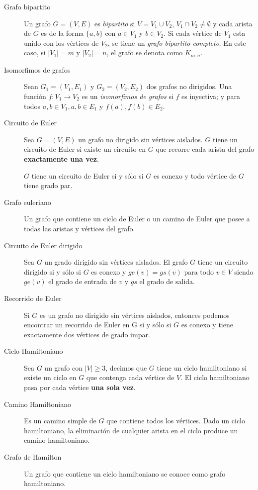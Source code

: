 \begin{description}
	\item[Grafo bipartito] Un grafo $G = (V,E)$ es \emph{bipartito} si $V = V_1 \cup V_2$, $V_1 \cap V_2 \neq \emptyset$ y cada arista de $G$ es de la forma $\{ a, b \}$ con $a \in V_1$ y $b \in V_2$. Si cada vértice de $V_1$ esta unido con los vértices de $V_2$, se tiene un \emph{grafo bipartito completo}.
	En este caso, si $|V_1| = m$ y $|V_2| = n$, el grafo se denota como $K_{m,n}$.
	
	\item[Isomorfimos de grafos] Sean $G_1 = (V_1, E_1)$ y $G_2 = (V_2, E_2)$ dos grafos no dirigidos.
	Una función $f:V_1 \rightarrow V_2$ es un \emph{isomorfimos de grafos} si $f$ es inyectiva; y para todos $a,b \in V_1, {a,b} \in E_1$ y ${f(a),f(b)} \in E_2$.
	
	\item[Circuito de Euler] Sea $G = (V,E)$ un grafo no dirigido sin vértices aislados.
	$G$ tiene un circuito de Euler si existe un circuito en $G$ que recorre cada arista del grafo \textbf{exactamente una vez}.
	
	$G$ tiene un circuito de Euler si y sólo si $G$ es conexo y todo vértice de $G$ tiene grado par.
	
	\item[Grafo euleriano] Un grafo que contiene un ciclo de Euler o un camino de Euler que posee a todas las aristas y vértices del grafo.
	
	\item[Circuito de Euler dirigido] Sea $G$ un grado dirigido sin vértices aislados.
	El grafo $G$ tiene un circuito dirigido si y sólo si $G$ es conexo y $ge(v) = gs(v)$ para todo $v \in V$ siendo $ge(v)$ el grado de entrada de $v$ y $gs$ el grado de salida. 
	
	\item[Recorrido de Euler] Si $G$ es un grafo no dirigido sin vértices aislados, entonces podemos encontrar un recorrido de Euler en G si y sólo si $G$ es conexo y tiene exactamente dos vértices de grado impar.
	
	\item[Ciclo Hamiltoniano] Sea $G$ un grafo con $|V| \ge 3$, decimos que $G$ tiene un ciclo hamiltoniano si existe un ciclo en $G$ que contenga cada vértice de $V$.
	El ciclo hamiltoniano pasa por cada vértice \textbf{una sola vez}.
	
	\item[Camino Hamiltoniano] Es un camino simple de $G$ que contiene todos los vértices.
	Dado un ciclo hamiltoniano, la eliminación de cualquier arista en el ciclo produce un
	camino hamiltoniano.
	
	\item[Grafo de Hamilton] Un grafo que contiene un ciclo hamiltoniano se conoce como grafo hamiltoniano.
\end{description}


